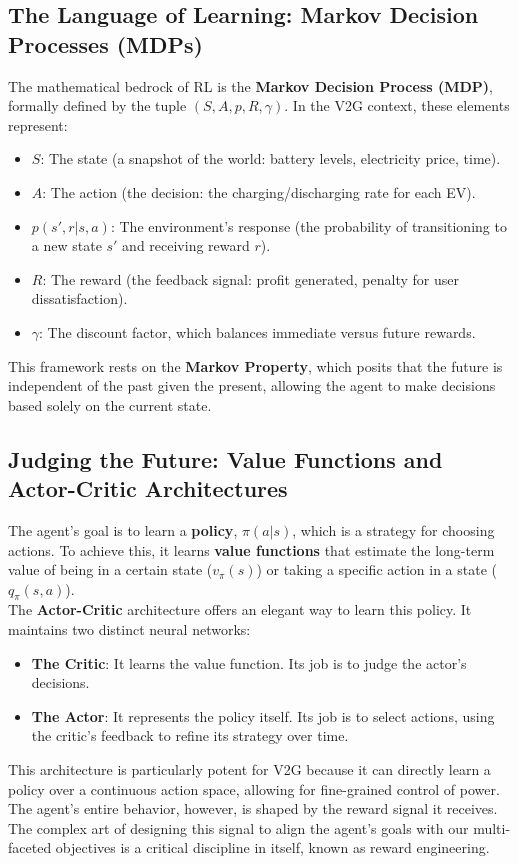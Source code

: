 \subsection{The Language of Learning: Markov Decision Processes (MDPs)}
The mathematical bedrock of RL is the \textbf{Markov Decision Process (MDP)}, formally defined by the tuple $(S, A, p, R, \gamma)$. In the V2G context, these elements represent:
\begin{itemize}
    \item $S$: The state (a snapshot of the world: battery levels, electricity price, time).
    \item $A$: The action (the decision: the charging/discharging rate for each EV).
    \item $p(s',r|s,a)$: The environment's response (the probability of transitioning to a new state $s'$ and receiving reward $r$).
    \item $R$: The reward (the feedback signal: profit generated, penalty for user dissatisfaction).
    \item $\gamma$: The discount factor, which balances immediate versus future rewards.
\end{itemize}
This framework rests on the \textbf{Markov Property}, which posits that the future is independent of the past given the present, allowing the agent to make decisions based solely on the current state.

\subsection{Judging the Future: Value Functions and Actor-Critic Architectures}
The agent's goal is to learn a \textbf{policy}, $\pi(a|s)$, which is a strategy for choosing actions. To achieve this, it learns \textbf{value functions} that estimate the long-term value of being in a certain state ($v_{\pi}(s)$) or taking a specific action in a state ($q_{\pi}(s, a)$).
\\
\noindent
The \textbf{Actor-Critic} architecture offers an elegant way to learn this policy. It maintains two distinct neural networks:
\begin{itemize}
    \item \textbf{The Critic}: It learns the value function. Its job is to judge the actor's decisions.
    \item \textbf{The Actor}: It represents the policy itself. Its job is to select actions, using the critic's feedback to refine its strategy over time.
\end{itemize}
This architecture is particularly potent for V2G because it can directly learn a policy over a continuous action space, allowing for fine-grained control of power. The agent's entire behavior, however, is shaped by the reward signal it receives. The complex art of designing this signal to align the agent's goals with our multi-faceted objectives is a critical discipline in itself, known as reward engineering.

